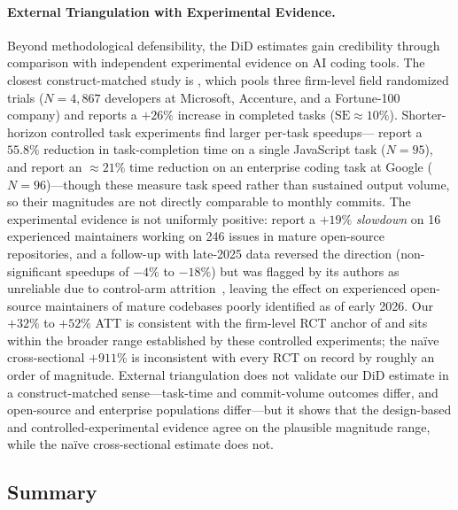 \paragraph{External Triangulation with Experimental Evidence.}
\label{sec:triangulation}

Beyond methodological defensibility, the DiD estimates gain credibility through comparison with independent experimental evidence on AI coding tools.
The closest construct-matched study is \citet{cui2025effects}, which pools three firm-level field randomized trials ($N = 4{,}867$ developers at Microsoft, Accenture, and a Fortune-100 company) and reports a $+26\%$ increase in completed tasks ($\text{SE} \approx 10\%$).
Shorter-horizon controlled task experiments find larger per-task speedups---\citet{DBLP:journals/corr/abs-2302-06590} report a $55.8\%$ reduction in task-completion time on a single JavaScript task ($N = 95$), and \citet{DBLP:conf/icse-seip/ParadisGMNMMZFC25} report an $\approx 21\%$ time reduction on an enterprise coding task at Google ($N = 96$)---though these measure task speed rather than sustained output volume, so their magnitudes are not directly comparable to monthly commits.
The experimental evidence is not uniformly positive: \citet{DBLP:journals/corr/abs-2507-09089} report a $+19\%$ \emph{slowdown} on 16 experienced maintainers working on 246 issues in mature open-source repositories, and a follow-up with late-2025 data reversed the direction (non-significant speedups of $-4\%$ to $-18\%$) but was flagged by its authors as unreliable due to control-arm attrition~\cite{metr2026uplift}, leaving the effect on experienced open-source maintainers of mature codebases poorly identified as of early 2026.
Our $+32\%$ to $+52\%$ ATT is consistent with the firm-level RCT anchor of \citet{cui2025effects} and sits within the broader range established by these controlled experiments; the na\"ive cross-sectional $+911\%$ is inconsistent with every RCT on record by roughly an order of magnitude.
External triangulation does not validate our DiD estimate in a construct-matched sense---task-time and commit-volume outcomes differ, and open-source and enterprise populations differ---but it shows that the design-based and controlled-experimental evidence agree on the plausible magnitude range, while the na\"ive cross-sectional estimate does not.

\subsection{Summary}
\label{sec:summary}

